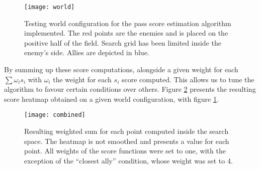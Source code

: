 \begin{figure}[h]
    \centering
    \texttt{[image: world]}
    \caption{Testing world configuration for the pass score estimation algorithm implemented. The red points are the enemies and
    is placed on the positive half of the field. Search grid has been limited inside the enemy's side. Allies are depicted in blue.}
    \label{fig:world-setup}
\end{figure}


By summing up these score computations, alongside a given weight for each $\sum{\omega_{i}s_i}$ with $\omega_i$ the weight for each $s_i$ score computed.
This allows us to tune the algorithm to favour certain conditions over others. Figure \ref{fig:combined} presents the resulting score heatmap obtained
on a given world configuration, with figure \ref{fig:world-setup}.

\begin{figure}[h]
    \centering
    \texttt{[image: combined]}
    \caption{Resulting weighted sum for each point computed inside the search space. The heatmap is not smoothed
    and presents a value for each point. All weights of the score functions were set to one, with the exception of the ``closest ally'' condition,
    whose weight was set to 4.}
    \label{fig:combined}
\end{figure}
